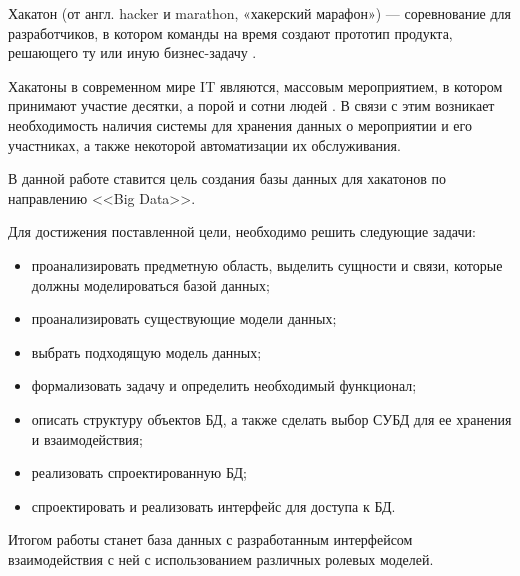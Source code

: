 Хакатон (от англ. hacker и marathon, «хакерский марафон») — соревнование для разработчиков, в котором команды на время создают прототип продукта, решающего ту или иную бизнес-задачу \cite{hackathon}.

Хакатоны в современном мире IT являются, массовым мероприятием, в котором принимают участие десятки, а порой и сотни людей \cite{leadersofdigital}. В связи с этим возникает необходимость наличия системы для хранения данных о мероприятии и его участниках, а также некоторой автоматизации 
 их обслуживания.

В данной работе ставится цель создания базы данных для хакатонов по направлению <<Big Data>>. 

Для достижения поставленной цели, необходимо решить следующие задачи:
\begin{itemize}
        \item проанализировать предметную область, выделить сущности и связи, которые должны моделироваться базой данных;
        \item проанализировать существующие модели данных;
        \item выбрать подходящую модель данных;
	\item формализовать задачу и определить необходимый функционал;
	\item описать структуру объектов БД, а также сделать выбор СУБД для ее хранения и взаимодействия;
	\item реализовать спроектированную БД;
	\item спроектировать и реализовать интерфейс для доступа к БД.
\end{itemize}

Итогом работы станет база данных с разработанным интерфейсом взаимодействия с ней с использованием различных ролевых моделей.